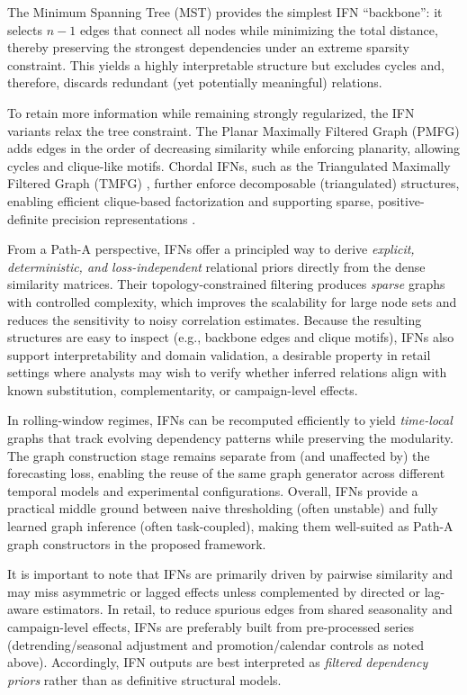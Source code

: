 The Minimum Spanning Tree (MST) provides the simplest IFN ``backbone'': it selects $n-1$ edges that connect all nodes while minimizing the total distance, thereby preserving the strongest dependencies under an extreme sparsity constraint. This yields a highly interpretable structure but excludes cycles and, therefore, discards redundant (yet potentially meaningful) relations.


To retain more information while remaining strongly regularized, the IFN variants relax the tree constraint. The Planar Maximally Filtered Graph (PMFG) \cite{tumminello2005pmfg} adds edges in the order of decreasing similarity while enforcing planarity, allowing cycles and clique-like motifs. Chordal IFNs, such as the Triangulated Maximally Filtered Graph (TMFG) \cite{massara2016tmfg}, further enforce decomposable (triangulated) structures, enabling efficient clique-based factorization and supporting sparse, positive-definite precision representations \cite{wang2022sparsificationfilteringspatialtemporalgnn}. 


From a Path-A perspective, IFNs offer a principled way to derive \emph{explicit, deterministic, and loss-independent} relational priors directly from the dense similarity matrices. Their topology-constrained filtering produces \emph{sparse} graphs with controlled complexity, which improves the scalability for large node sets and reduces the sensitivity to noisy correlation estimates. Because the resulting structures are easy to inspect (e.g., backbone edges and clique motifs), IFNs also support interpretability and domain validation, a desirable property in retail settings where analysts may wish to verify whether inferred relations align with known substitution, complementarity, or campaign-level effects. 

In rolling-window regimes, IFNs can be recomputed efficiently to yield \emph{time-local} graphs that track evolving dependency patterns while preserving the modularity. The graph construction stage remains separate from (and unaffected by) the forecasting loss, enabling the reuse of the same graph generator across different temporal models and experimental configurations. Overall, IFNs provide a practical middle ground between naive thresholding (often unstable) and fully learned graph inference (often task-coupled), making them well-suited as Path-A graph constructors in the proposed framework.

It is important to note that IFNs are primarily driven by pairwise similarity and may miss asymmetric or lagged effects unless complemented by directed or lag-aware estimators. In retail, to reduce spurious edges from shared seasonality and campaign-level effects, IFNs are preferably built from pre-processed series (detrending/seasonal adjustment and promotion/calendar controls as noted above). Accordingly, IFN outputs are best interpreted as \emph{filtered dependency priors} rather than as definitive structural models.

